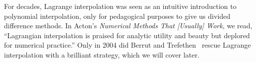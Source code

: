 \begin{rmk}
  For decades, Lagrange interpolation was seen as an intuitive
  introduction to polynomial interpolation, only for pedagogical
  purposes to give us divided difference methods.
  In Acton's \emph{Numerical Methods That [Usually] Work}, we read,
  ``Lagrangian interpolation is praised for analytic utility and beauty
  but deplored for numerical practice.''
  Only in 2004 did Berrut and Trefethen~\cite{berrut2004barycentric}
  rescue Lagrange interpolation with a brilliant strategy, which we will
  cover later.
\end{rmk}
